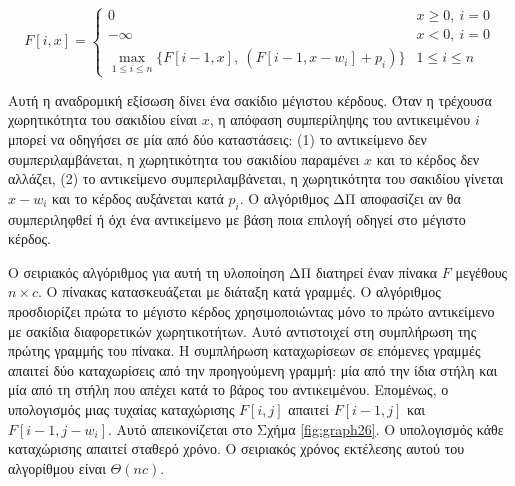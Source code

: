 \documentclass[12pt,a4paper]{article}
\begin{document}
\[
F[i, x] =
\begin{cases}
0 & x \geq 0,\ i = 0 \\[4pt]
-\infty & x < 0,\ i = 0 \\[4pt]
\displaystyle \max_{1 \leq i \leq n}\{F[i-1, x],\ \left(F[i-1, x - w_i] + p_i\right)\}
  & 1 \leq i \leq n
\end{cases}
\]
\vspace{0.2cm}

Αυτή η αναδρομική εξίσωση δίνει ένα σακίδιο μέγιστου κέρδους. Όταν η
τρέχουσα χωρητικότητα του σακιδίου είναι $x$, η απόφαση συμπερίληψης
του αντικειμένου $i$ μπορεί να οδηγήσει σε μία από δύο καταστάσεις:
(1) το αντικείμενο δεν συμπεριλαμβάνεται, η χωρητικότητα του σακιδίου
παραμένει $x$ και το κέρδος δεν αλλάζει, (2) το αντικείμενο
συμπεριλαμβάνεται, η χωρητικότητα του σακιδίου γίνεται $x - w_i$ και
το κέρδος αυξάνεται κατά $p_i$. Ο αλγόριθμος ΔΠ αποφασίζει αν θα
συμπεριληφθεί ή όχι ένα αντικείμενο με βάση ποια επιλογή οδηγεί στο
μέγιστο κέρδος.

Ο σειριακός αλγόριθμος για αυτή τη υλοποίηση ΔΠ διατηρεί έναν πίνακα
$F$ μεγέθους $n \times c$. Ο πίνακας κατασκευάζεται με διάταξη κατά γραμμές. 
Ο αλγόριθμος προσδιορίζει πρώτα το μέγιστο κέρδος
χρησιμοποιώντας μόνο το πρώτο αντικείμενο με σακίδια διαφορετικών
χωρητικοτήτων. Αυτό αντιστοιχεί στη συμπλήρωση της πρώτης γραμμής
του πίνακα. Η συμπλήρωση καταχωρίσεων σε επόμενες γραμμές απαιτεί
δύο καταχωρίσεις από την προηγούμενη γραμμή: μία από την ίδια στήλη
και μία από τη στήλη που απέχει κατά το βάρος του αντικειμένου.
Επομένως, ο υπολογισμός μιας τυχαίας καταχώρισης $F[i, j]$ απαιτεί
$F[i-1, j]$ και $F[i-1, j-w_i]$. Αυτό απεικονίζεται στο Σχήμα \ref{fig:graph26}.
Ο υπολογισμός κάθε καταχώρισης απαιτεί σταθερό χρόνο. Ο σειριακός
χρόνος εκτέλεσης αυτού του αλγορίθμου είναι $\Theta(nc)$.
\end{document}
